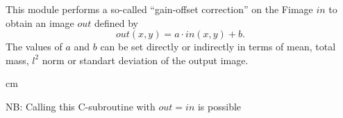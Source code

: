 
This module performs a so-called ``gain-offset correction'' on the Fimage
$in$ to obtain an image $out$ defined by 
$$out(x,y) = a \cdot in(x,y) + b.$$
The values of $a$ and $b$ can be set directly or indirectly in terms
of mean, total mass, $l^2$ norm or standart deviation of the output image.

 cm

NB: Calling this C-subroutine with $out=in$ is possible
